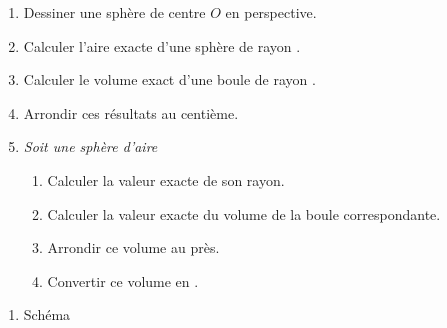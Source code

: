 \begin{methode}
    \exercice
    \begin{enumerate}
        \item Dessiner une sphère de centre $O$ en perspective.
        \item Calculer l'aire exacte d'une sphère de rayon .
        \item Calculer le volume exact d'une boule de rayon .
        \item Arrondir ces résultats au centième.
        \item \textit{Soit une sphère d'aire }
        \begin{enumerate}
            \item Calculer la valeur exacte de son rayon.
            \item Calculer la valeur exacte du volume de la boule correspondante.
            \item Arrondir ce volume au \Vol[cm]{} près.
            \item Convertir ce volume en \Vol[dm]{}.
        \end{enumerate}
    \end{enumerate}
    \correction
    \begin{enumerate}
        \item Schéma
        

\end{enumerate}
\end{methode}
